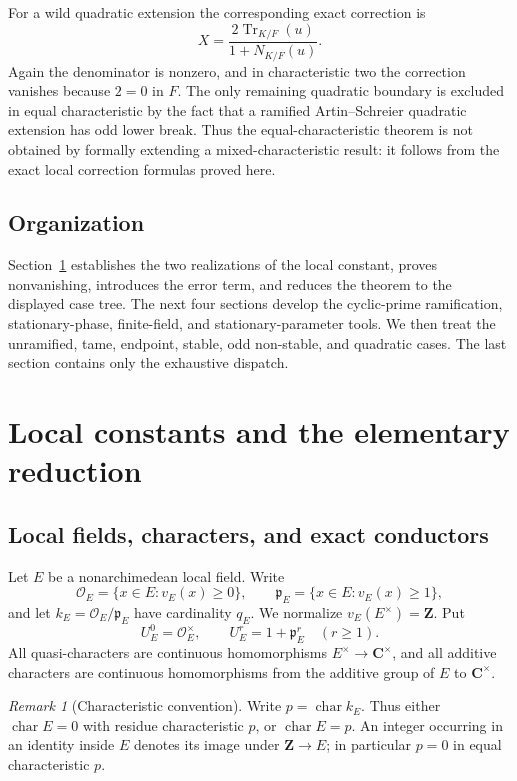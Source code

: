 \documentclass[11pt]{amsart}
\theoremstyle{definition}
\theoremstyle{remark}
\newtheorem{remark}[theorem]{Remark}
\newcommand{\C}{\mathbf C}
\newcommand{\cO}{\mathcal O}
\newcommand{\p}{\mathfrak p}
\newcommand{\Tr}{\operatorname{Tr}}
\begin{document}
For a wild quadratic extension the corresponding exact correction is
\[
 X=\frac{2\Tr_{K/F}(u)}{1+N_{K/F}(u)}.
\]
Again the denominator is nonzero, and in characteristic two the
correction vanishes because $2=0$ in $F$.  The only remaining quadratic
boundary is excluded in equal characteristic by the fact that a
ramified Artin--Schreier quadratic extension has odd lower break.  Thus
the equal-characteristic theorem is not obtained by formally extending
a mixed-characteristic result: it follows from the exact local
correction formulas proved here.

\subsection*{Organization}
Section~\ref{sec:local-notation} establishes the two realizations of the
local constant, proves nonvanishing, introduces the error term, and
reduces the theorem to the displayed case tree.  The next four sections
develop the cyclic-prime ramification, stationary-phase, finite-field,
and stationary-parameter tools.  We then treat the unramified, tame,
endpoint, stable, odd non-stable, and quadratic cases.  The last section
contains only the exhaustive dispatch.
 
\section{Local constants and the elementary reduction}
\label{sec:local-notation}

\subsection{Local fields, characters, and exact conductors}

Let $E$ be a nonarchimedean local field.  Write
\[
 \cO_E=\{x\in E:v_E(x)\ge0\},
 \qquad
 \p_E=\{x\in E:v_E(x)\ge1\},
\]
and let $k_E=\cO_E/\p_E$ have cardinality $q_E$.  We normalize
$v_E(E^\times)=\mathbf Z$.  Put
\[
 U_E^0=\cO_E^\times,
 \qquad
 U_E^r=1+\p_E^r\quad(r\ge1).
\]
All quasi-characters are continuous homomorphisms
$E^\times\to\C^\times$, and all additive characters are continuous
homomorphisms from the additive group of $E$ to $\C^\times$.

\begin{remark}[Characteristic convention]
\label{rem:characteristic-convention}
Write $p=\operatorname{char}k_E$.  Thus either
$\operatorname{char}E=0$ with residue characteristic $p$, or
$\operatorname{char}E=p$.  An integer occurring in an identity inside
$E$ denotes its image under $\mathbf Z\to E$; in particular $p=0$ in
equal characteristic $p$.
\end{remark}
\end{document}
